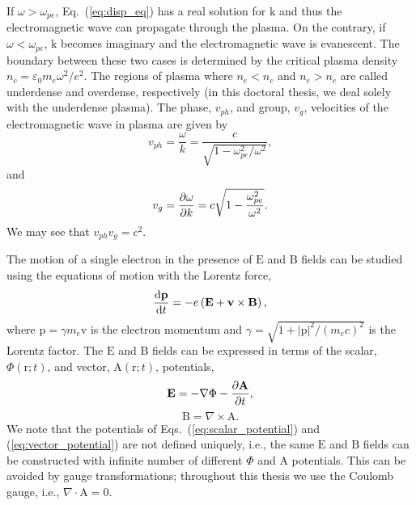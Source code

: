 \documentclass[10pt, a4paper, twoside, openright]{report}
\newcommand{\norm}[1]{|#1|}
\renewcommand{\vec}[1]{\boldsymbol{\mathrm{#1}}}
\newcommand{\rot}[1]{\nabla \times #1}
\newcommand{\grad}[1]{\nabla #1}
\renewcommand{\div}[1]{\nabla \cdot #1}
\begin{document}
If $ \omega > \omega_{pe} $, Eq.~(\ref{eq:disp_eq}) has a real solution for $ \vec{k} $ and thus the electromagnetic wave can propagate through the plasma. On the contrary, if $ \omega < \omega_{pe} $, $ \vec{k} $ becomes imaginary and the electromagnetic wave is evanescent. The boundary between these two cases is determined by the critical plasma density $ n_c = \varepsilon_0 m_e \omega^2 / e^2 $. The regions of plasma where $ n_e < n_c $ and $ n_e > n_c $ are called underdense and overdense, respectively (in this doctoral thesis, we deal solely with the underdense plasma). The phase, $ v_{ph} $, and group, $ v_g $, velocities of the electromagnetic wave in plasma are given by
\begin{equation}\label{eq:phase_velocity}
	v_{ph} = \frac{\omega}{k} = \frac{c}{\sqrt{1 - \omega_{pe}^2 / \omega^2}},
\end{equation}
and
\begin{equation}\label{eq:group_velocity}
	v_g = \diffp{\omega}{k} = c \sqrt{1 - \frac{\omega_{pe}^2}{\omega^2}}.
\end{equation}
We may see that $ v_{ph} v_{g} = c^2 $. 

The motion of a single electron in the presence of $ \vec{E} $ and $ \vec{B} $ fields can be studied using the equations of motion with the Lorentz force,
\begin{equation}\label{eq:lorentz_eq}
	\diff{\vec{p}}{t} = -e \left( \vec{E} + \vec{v} \times \vec{B} \right),
\end{equation}
where $ \vec{p} = \gamma m_e \vec{v} $ is the electron momentum and $ \gamma = \sqrt{1 + \norm{\vec{p}}^2 / \left( m_e c \right)^2 } $ is the Lorentz factor. The $ \vec{E} $ and $ \vec{B} $ fields can be expressed in terms of the scalar, $ \Phi \left( \vec{r}; t \right) $, and vector, $ \vec{A} \left( \vec{r}; t \right) $, potentials,
\begin{equation}\label{eq:scalar_potential}
	\vec{E} = -\grad{\Phi} - \diffp{\vec{A}}{t},
\end{equation}
\begin{equation}\label{eq:vector_potential}
	\vec{B} = \rot{\vec{A}}.
\end{equation}
We note that the potentials of Eqs.~(\ref{eq:scalar_potential}) and (\ref{eq:vector_potential}) are not defined uniquely, i.e., the same $ \vec{E} $ and $ \vec{B} $ fields can be constructed with infinite number of different $ \Phi $ and $ \vec{A} $ potentials. This can be avoided by gauge transformations; throughout this thesis we use the Coulomb gauge, i.e., $ \div{\vec{A}} = 0 $. 
\end{document}
